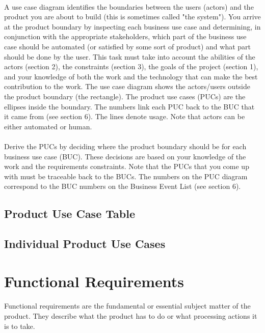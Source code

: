 \documentclass[12pt,a4paper]{article}
\begin{document}
\paragraph{}
A use case diagram identifies the boundaries between the users (actors) and the product you are about to build (this is sometimes called "the system"). You arrive at the product boundary by inspecting each business use case and determining, in conjunction with the appropriate stakeholders, which part of the business use case should be automated (or satisfied by some sort of product) and what part should be done by the user. This task must take into account the abilities of the actors (section 2), the constraints (section 3), the goals of the project (section 1), and your knowledge of both the work and the technology that can make the best contribution to the work.
The use case diagram shows the actors/users outside the product boundary (the rectangle). The product use cases (PUCs) are the ellipses inside the boundary. The numbers link each PUC back to the BUC that it came from (see section 6). The lines denote usage. Note that actors can be either automated or human.
\paragraph{}
Derive the PUCs by deciding where the product boundary should be for each business use case (BUC). These decisions are based on your knowledge of the work and the requirements constraints. Note that the PUCs that you come up with must be traceable back to the BUCs. The numbers on the PUC diagram correspond to the BUC numbers on the Business Event List (see section 6).
\subsection{Product Use Case Table}
\subsection{Individual Product Use Cases}
\pagebreak
\section{Functional Requirements}
\paragraph{}
Functional requirements are the fundamental or essential subject matter of the product. They describe what the product has to do or what processing actions it is to take.
\end{document}
